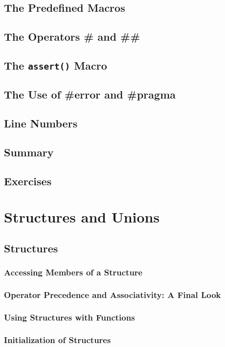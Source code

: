 \documentclass{article}
\begin{document}
\section{The Predefined Macros}
\section{The Operators \# and \#\#}
\section{The \texttt{assert()} Macro}
\section{The Use of \#error and \#pragma}
\section{Line Numbers}
\section{Summary}
\section{Exercises}

\chapter{Structures and Unions}

\section{Structures}
\subsection{Accessing Members of a Structure}
\subsection{Operator Precedence and Associativity: A Final Look}
\subsection{Using Structures with Functions}
\subsection{Initialization of Structures}
\end{document}
